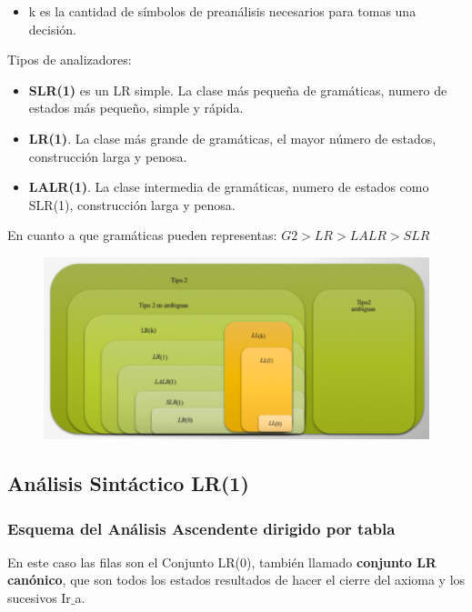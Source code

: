 \documentclass[12pt]{report} %
\begin{document}
\begin{itemize}
  \item k es la cantidad de símbolos de preanálisis necesarios para tomas una decisión.
\end{itemize}

Tipos de analizadores:
\begin{itemize}
  \item \textbf{SLR(1)} es un LR simple. La clase más pequeña de gramáticas, numero de estados más pequeño, simple y rápida.
  \item \textbf{LR(1)}. La clase más grande de gramáticas, el mayor número de estados, construcción larga y penosa.
  \item \textbf{LALR(1)}. La clase intermedia de gramáticas, numero de estados como SLR(1), construcción larga y penosa.
\end{itemize}
En cuanto a que gramáticas pueden representas: $G2>LR>LALR>SLR$

\begin{figure}[H]
	{\includegraphics[scale=.57]{2021-04-13 15_35_24-ASintactico.pdf - Foxit Reader.png}}
\end{figure}

\subsection{Análisis Sintáctico LR(1)}

\subsubsection{Esquema del Análisis Ascendente dirigido por tabla}
En este caso las filas son el Conjunto LR(0), también llamado \textbf{conjunto LR canónico}, que son todos los estados resultados de hacer el cierre del axioma y los sucesivos Ir$\_$a.
\end{document}
